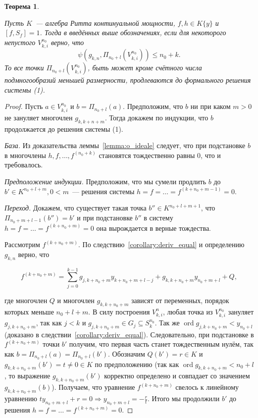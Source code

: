 \documentclass[16pt]{article}
\DeclareMathOperator{\ord}{ord}
\renewcommand{\le}{\leqslant} %
\theoremstyle{plain1}
\theoremstyle{plain2}
\theoremstyle{plain}
\newtheorem{theorem}{Теорема}
\theoremstyle{plain3}
\theoremstyle{definition}
\theoremstyle{remark}
\begin{document}
\begin{theorem}\label{theorem:general th1}

Пусть $K$~--- алгебра Ритта континуальной мощности, $f,h\in K\{y\}$ и $[f,S_f]=1$. Тогда в введённых выше обозначениях, если для некоторого непустого ${V}_{k,i}^{n_0}$ верно, что
\begin{equation}
\psi(g_{k,n},\Pi_{n_0+l}({V}_{k,i}^{n_0}))\le n_0+k.
\end{equation}
То все точки $\Pi_{n_0+l}({V}_{k,i}^{n_0})$, быть может кроме счётного числа подмногообразий меньшей размерности, продлеваются до формального решения системы (1).
\end{theorem}

\begin{proof}
Пусть $a\in {V}_{k,i}^{n_0}$ и $b=\Pi_{n_0+l}(a)$. Предположим, что $b$ ни при каком $m>0$ не зануляет многочлен $g_{k,k+n+m}$. Тогда докажем по индукции, что $b$ продолжается до решения системы (1).

\emph{База.} Из доказательства леммы~\ref{lemma:o_ideale} следует, что при подстановке $b$ в многочлены $h,f,\ldots,f^{(n_0+k)}$ становятся тождественно равны 0, что и требовалось.

\emph{Предположение индукции.} Предположим, что мы сумели продлить $b$ до $b'\in K^{n_0+l+m}, 0< m$~--- решения системы $h=f=\ldots=f^{(k+n_0+m-1)}=0$.

\emph{Переход.} Докажем, что существует такая точка $b''\in K^{n_0+l+m+1}$, что $\Pi_{n_0+m+l-1}(b'')=b'$ и при подстановке $b''$ в систему $h=f=\ldots=f^{(k+n_0+m)}=0$ она вырождается в верные тождества.

Рассмотрим $f^{(k+n_0+m)}$. По следствию~\ref{corollary:deriv_equal} и определению $g_{k,n}$ верно, что

$$
f^{(k+n_0+m)}=\sum\limits_{j=0}^{k-1} g_{j,k+n_0+m}y_{k+n_0+m+l -j}+g_{k,k+n_0+m}y_{n_0+m+l}  + Q,
$$

где многочлен $Q$ и многочлен $g_{k,k+n_0+m}$ зависят от переменных, порядок которых меньше $n_0+l+m$. В силу построения ${V}_{k,i}^n$, любая точка из ${V}_{k,i}^{n_0}$ зануляет $g_{j,k+n_0+m}$, так как $j < k$ и $g_{j,k+n_0+m}\in G_j\subseteq S_k^{n_0}$. Так же $\ord g_{j,k+n_0+m}<y_{n_0+l}$ (доказано в следствии~\ref{corollary:deriv_equal}). Следовательно, при подстановке в $f^{(k+n_0+m)}$ точки $b'$ получим, что первая часть станет тождественным нулём, так как $b=\Pi_{n_0+l}(a)=\Pi_{n_0+l}(b')$. Обозначим $Q(b')=r\in K$ и $g_{k,k+n_0+m}(b')=t\neq 0\in K$ по предположению (так как $\ord g_{k,k+n_0+m}< n_0+l$, то выражение $g_{k,k+n_0+m}(b')$ корректно определено и совпадает со значением $g_{k,k+n_0+m}(b)$). Получаем, что уравнение $f^{(k+n_0+m)}$ свелось к линейному уравнению $t y_{n_0+m+l}+r=0\Rightarrow y_{n_0+m+l}=-\frac{r}{t}$. Итого мы продолжили $b'$ до решения $h=f=\ldots=f^{(k+n_0+m)}=0$.


\end{proof}
\end{document}

